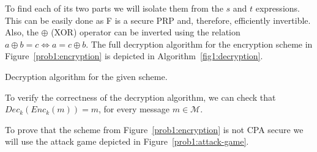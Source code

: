 To find each of its two parts we will isolate them from the $s$ and $t$ expressions.
This can be easily done as F is a secure PRP and, therefore, efficiently invertible.
Also, the $\oplus$ (XOR) operator can be inverted using the relation $a \oplus b = c \Leftrightarrow a = c \oplus b$.
The full decryption algorithm for the encryption scheme in Figure~\ref{prob1:encryption} is depicted in Algorithm~\ref{fig1:decryption}.
\begin{algorithm}
    \DontPrintSemicolon
    \caption{Decryption algorithm for the given scheme.\label{fig1:decryption}}
\end{algorithm}

To verify the correctness of the decryption algorithm, we can check that $Dec_k (Enc_k (m)) = m$, for every message $m \in \mathcal{M}$.


To prove that the scheme from Figure~\ref{prob1:encryption} is not CPA secure we will use the attack game depicted in Figure~\ref{prob1:attack-game}.

